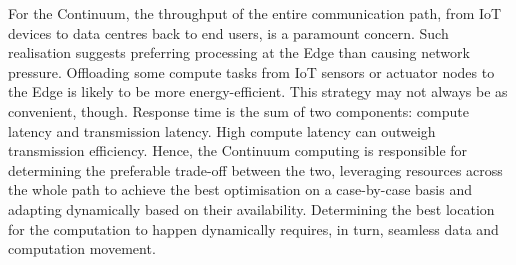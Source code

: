 
For the Continuum, the throughput of the entire communication path, from IoT devices to data centres back to end users, is a paramount concern. Such realisation suggests preferring processing at the Edge than causing network pressure. 
Offloading some compute tasks from IoT sensors or actuator nodes to the Edge is likely to be more energy-efficient. 
This strategy may not always be as convenient, though. 
Response time is the sum of two components: compute latency and transmission latency. High compute latency can outweigh transmission efficiency. 
Hence, the Continuum computing is responsible for determining the preferable trade-off between the two, leveraging resources across the whole path to achieve the best optimisation on a case-by-case basis and adapting dynamically based on their availability. Determining the best location for the computation to happen dynamically requires, in turn, seamless data and computation movement.


